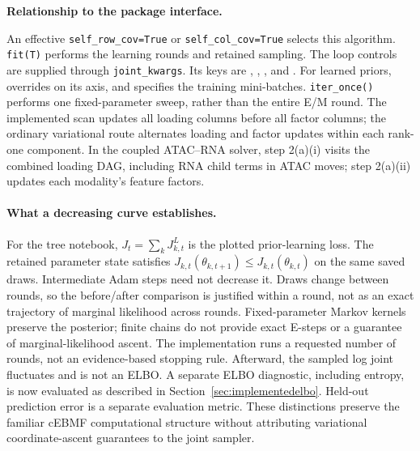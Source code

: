 \textbf{Relationship to the package interface.}
\par\smallskip
An effective \texttt{self\_row\_cov=True} or
\texttt{self\_col\_cov=True} selects this algorithm.
\texttt{fit(T)} performs the learning rounds and retained sampling.
The loop controls are supplied through \texttt{joint\_kwargs}.
Its keys are , , ,
 and .
For learned priors,  overrides  on its axis,
and  specifies the training mini-batches.
\texttt{iter\_once()} performs one fixed-parameter sweep, rather than the
entire E/M round. The implemented scan updates all loading columns before
all factor columns; the ordinary variational route alternates loading and
factor updates within each rank-one component. In the coupled ATAC--RNA
solver, step 2(a)(i) visits the combined loading DAG, including RNA child
terms in ATAC moves; step 2(a)(ii) updates each modality's feature factors.

\paragraph{What a decreasing curve establishes.}
For the tree notebook, \(J_t=\sum_kJ^L_{k,t}\) is the plotted prior-learning
loss. The retained parameter state satisfies
\(J_{k,t}(\theta_{k,t+1})\leq J_{k,t}(\theta_{k,t})\) on the same saved
draws. Intermediate Adam steps need not decrease it. Draws change between
rounds, so the before/after comparison is justified within a round, not as
an exact trajectory of marginal likelihood across rounds. Fixed-parameter
Markov kernels preserve the posterior; finite chains do not provide exact
E-steps or a guarantee of marginal-likelihood ascent. The implementation
runs a requested number of rounds, not an evidence-based stopping rule.
Afterward, the sampled log joint fluctuates and is not an ELBO. A separate
ELBO diagnostic, including entropy, is now evaluated as described in
Section~\ref{sec:implementedelbo}. Held-out
prediction error is a separate evaluation metric. These distinctions
preserve the familiar cEBMF computational structure without attributing
variational coordinate-ascent guarantees to the joint sampler.

